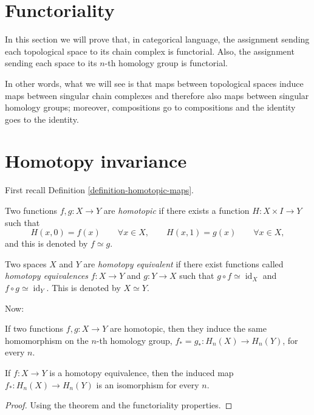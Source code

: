 \section{Functoriality}
\label{section-homology-functoriality}

In this section we will prove that, in
categorical language,
the assignment sending each topological space
to its chain
complex is functorial. Also, the assignment
sending each
space to its $n$-th homology group is
functorial.

In other words, what we will see is that maps
between
topological spaces induce maps between
singular chain
complexes and therefore also maps between
singular homology
groups; moreover, compositions go to
compositions and the
identity goes to the identity.
\section{Homotopy invariance}
\label{section-homology-homotopy-invariance}

First recall Definition
\ref{definition-homotopic-maps}.

\begin{definition}
Two functions $f,g:X\to Y$ are
\emph{homotopic} if there
exists a function $H:X\times I\to Y$ such
that
$$
H(x,0)=f(x)\qquad\forall x\in X,
\qquad
H(x,1)=g(x)\qquad\forall x\in X,
$$
and this is denoted by $f\simeq g$.
\end{definition}

\begin{definition}
Two spaces $X$ and $Y$ are \emph{homotopy
equivalent} if
there exist functions called \emph{homotopy
equivalences}
$f:X\to Y$ and $g:Y\to X$ such that
$g\circ f\simeq\operatorname{id}_X$ and
$f\circ g\simeq\operatorname{id}_Y$. This is
denoted by $X\simeq Y$.
\end{definition}

Now:

\begin{theorem}
If two functions $f,g:X\to Y$ are homotopic,
then they induce
the same homomorphism on the $n$-th homology
group,
$f_*=g_*:H_n(X)\to H_n(Y)$, for every $n$.
\end{theorem}

\begin{corollary}
If $f:X\to Y$ is a homotopy equivalence, then
the induced map
$f_*:H_n(X)\to H_n(Y)$ is an isomorphism for
every $n$.
\end{corollary}

\begin{proof}
Using the theorem and the functoriality
properties.
\end{proof}

